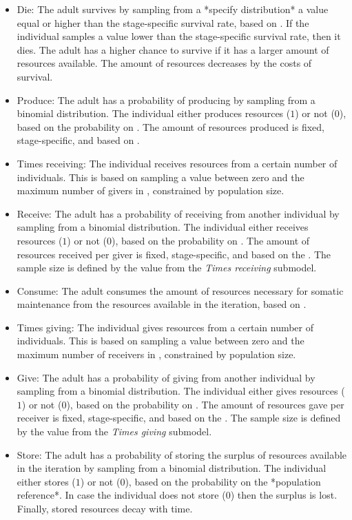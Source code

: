 \documentclass{article}
\begin{document}
\begin{itemize}
    \item Die: The adult survives by sampling from a *specify distribution* a value equal or higher than the stage-specific survival rate, based on \cite{gurven2007longevity}. If the individual samples a value lower than the stage-specific survival rate, then it dies. The adult has a higher chance to survive if it has a larger amount of resources available. The amount of resources decreases by the costs of survival.
    \item Produce: The adult has a probability of producing by sampling from a binomial distribution. The individual either produces resources ($1$) or not ($0$), based on the probability on \cite{koster2020life}. The amount of resources produced is fixed, stage-specific, and based on \cite{koster2020life}.
    \item Times receiving: The individual receives resources from a certain number of individuals. This is based on sampling a value between zero and the maximum number of givers in \cite{gurven2004give}, constrained by population size.
    \item Receive: The adult has a probability of receiving from another individual by sampling from a binomial distribution. The individual either receives resources ($1$) or not ($0$), based on the probability on \cite{gurven2004give}. The amount of resources received per giver is fixed, stage-specific, and based on the \cite{gurven2004give}. The sample size is defined by the value from the \emph{Times receiving} submodel. 
    \item Consume: The adult consumes the amount of resources necessary for somatic maintenance from the resources available in the iteration, based on \cite{kaplan2000theory}.
    \item Times giving: The individual gives resources from a certain number of individuals. This is based on sampling a value between zero and the maximum number of receivers in \cite{gurven2004give}, constrained by population size.
    \item Give: The adult has a probability of giving from another individual by sampling from a binomial distribution. The individual either gives resources ($1$) or not ($0$), based on the probability on \cite{gurven2004give}. The amount of resources gave per receiver is fixed, stage-specific, and based on the \cite{gurven2004give}. The sample size is defined by the value from the \emph{Times giving} submodel. 
    \item Store: The adult has a probability of storing the surplus of resources available in the iteration by sampling from a binomial distribution. The individual either stores ($1$) or not ($0$), based on the probability on the *population reference*. In case the individual does not store ($0$) then the surplus is lost. Finally, stored resources decay with time.

\end{itemize}
\end{document}
